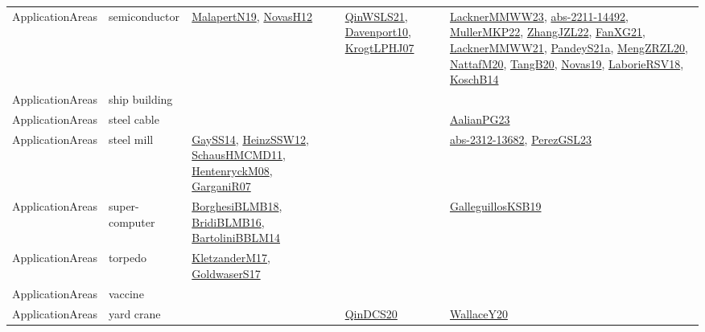 {\begin{longtable}{lp{3cm}>{\raggedright}p{6cm}>{\raggedright}p{6cm}p{8cm}}
ApplicationAreas & semiconductor & \href{papers/MalapertN19.pdf}{MalapertN19}\cite{MalapertN19}, \href{articles/NovasH12.pdf}{NovasH12}\cite{NovasH12} & \href{articles/QinWSLS21.pdf}{QinWSLS21}\cite{QinWSLS21}, \href{papers/Davenport10.pdf}{Davenport10}\cite{Davenport10}, \href{papers/KrogtLPHJ07.pdf}{KrogtLPHJ07}\cite{KrogtLPHJ07} & \href{articles/LacknerMMWW23.pdf}{LacknerMMWW23}\cite{LacknerMMWW23}, \href{articles/abs-2211-14492.pdf}{abs-2211-14492}\cite{abs-2211-14492}, \href{articles/MullerMKP22.pdf}{MullerMKP22}\cite{MullerMKP22}, \href{papers/ZhangJZL22.pdf}{ZhangJZL22}\cite{ZhangJZL22}, \href{articles/FanXG21.pdf}{FanXG21}\cite{FanXG21}, \href{papers/LacknerMMWW21.pdf}{LacknerMMWW21}\cite{LacknerMMWW21}, \href{articles/PandeyS21a.pdf}{PandeyS21a}\cite{PandeyS21a}, \href{articles/MengZRZL20.pdf}{MengZRZL20}\cite{MengZRZL20}, \href{papers/NattafM20.pdf}{NattafM20}\cite{NattafM20}, \href{papers/TangB20.pdf}{TangB20}\cite{TangB20}, \href{articles/Novas19.pdf}{Novas19}\cite{Novas19}, \href{articles/LaborieRSV18.pdf}{LaborieRSV18}\cite{LaborieRSV18}, \href{papers/KoschB14.pdf}{KoschB14}\cite{KoschB14}\\
ApplicationAreas & ship building &  &  & \\
ApplicationAreas & steel cable &  &  & \href{papers/AalianPG23.pdf}{AalianPG23}\cite{AalianPG23}\\
ApplicationAreas & steel mill & \href{papers/GaySS14.pdf}{GaySS14}\cite{GaySS14}, \href{articles/HeinzSSW12.pdf}{HeinzSSW12}\cite{HeinzSSW12}, \href{articles/SchausHMCMD11.pdf}{SchausHMCMD11}\cite{SchausHMCMD11}, \href{papers/HentenryckM08.pdf}{HentenryckM08}\cite{HentenryckM08}, \href{papers/GarganiR07.pdf}{GarganiR07}\cite{GarganiR07} &  & \href{articles/abs-2312-13682.pdf}{abs-2312-13682}\cite{abs-2312-13682}, \href{papers/PerezGSL23.pdf}{PerezGSL23}\cite{PerezGSL23}\\
ApplicationAreas & super-computer & \href{articles/BorghesiBLMB18.pdf}{BorghesiBLMB18}\cite{BorghesiBLMB18}, \href{articles/BridiBLMB16.pdf}{BridiBLMB16}\cite{BridiBLMB16}, \href{papers/BartoliniBBLM14.pdf}{BartoliniBBLM14}\cite{BartoliniBBLM14} &  & \href{papers/GalleguillosKSB19.pdf}{GalleguillosKSB19}\cite{GalleguillosKSB19}\\
ApplicationAreas & torpedo & \href{papers/KletzanderM17.pdf}{KletzanderM17}\cite{KletzanderM17}, \href{papers/GoldwaserS17.pdf}{GoldwaserS17}\cite{GoldwaserS17} &  & \\
ApplicationAreas & vaccine &  &  & \\
ApplicationAreas & yard crane &  & \href{articles/QinDCS20.pdf}{QinDCS20}\cite{QinDCS20} & \href{articles/WallaceY20.pdf}{WallaceY20}\cite{WallaceY20}\\

\end{longtable}}
